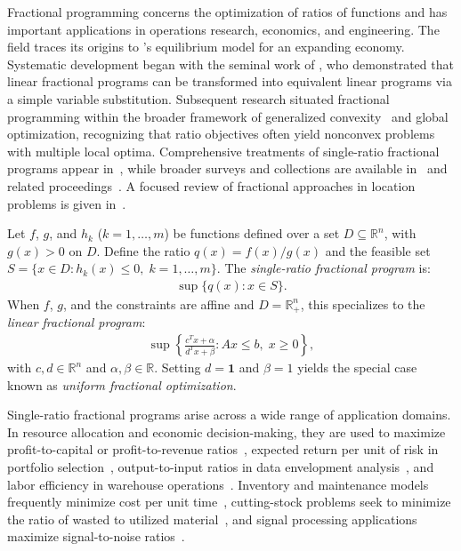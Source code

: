 Fractional programming concerns the optimization of ratios of functions
and has important applications in operations research, economics, and
engineering. The field traces its origins to
\cite{vonNeumann1937}'s equilibrium model for an expanding economy.
Systematic development began with the seminal work of
\cite{charnes1962}, who demonstrated that linear fractional programs
can be transformed into equivalent linear programs via a simple
variable substitution. Subsequent research situated fractional
programming within the broader framework of generalized
convexity~\citep{martos1975} and global optimization, recognizing that
ratio objectives often yield nonconvex problems with multiple local
optima. Comprehensive treatments of single-ratio fractional programs
appear in~\cite{schaible1978analyse, schaible1981generalized,
schaible1983fractional, craven1988fractional, stancu1997fractional},
while broader surveys and collections are available
in~\cite{FloudasPardalos02, schaible2002, schaibleshi2004, Frenk2005,
cambini2009generalized} and related
proceedings~\citep{cambini1990generalized, crouzeix1998generalized,
singh1989continuous, schaible1995fractional}. A focused
review of fractional approaches in location problems is given
in~\cite{barros1998discrete}.

Let $f$, $g$, and $h_k$ ($k=1,\dots,m$) be functions defined over a
set $D \subseteq \mathbb{R}^n$, with $g(x) > 0$ on $D$. Define the
ratio $q(x) = f(x)/g(x)$ and the feasible set
$S = \{x \in D : h_k(x) \le 0, \; k=1,\dots,m\}$.
The \emph{single-ratio fractional program} is:
\begin{align}
    \label{form.P}
    \sup \{ q(x) : x \in S \}.
\end{align}
When $f$, $g$, and the constraints are affine and
$D = \mathbb{R}_+^n$, this specializes to the
\emph{linear fractional program}:
\begin{align}
    \label{form.LCFP}
    \sup \left\{ \frac{c^T x + \alpha}{d^T x + \beta} :
        Ax \le b, \; x \ge 0 \right\},
\end{align}
with $c,d \in \mathbb{R}^n$ and $\alpha,\beta \in \mathbb{R}$.
Setting $d = \mathbf{1}$ and $\beta = 1$ yields the special case
known as \emph{uniform fractional optimization}.

Single-ratio fractional programs arise across a wide range of
application domains. In resource allocation and economic
decision-making, they are used to maximize profit-to-capital or
profit-to-revenue ratios~\citep{barros1998discrete, barros1997fractional,
mjelde1983methods}, expected return per unit of risk in portfolio
selection~\citep{schaible1995fractional}, output-to-input ratios in
data envelopment analysis~\citep{charnes1978measuring}, and labor
efficiency in warehouse operations~\citep{hoskins1984optimal}.
Inventory and maintenance models frequently minimize cost per unit
time~\citep{frenk1997marginal, barros1997optimizing}, cutting-stock
problems seek to minimize the ratio of wasted to utilized
material~\citep{GilmoreGomory1963}, and signal processing applications
maximize signal-to-noise ratios~\citep{falk1969maximization}.

